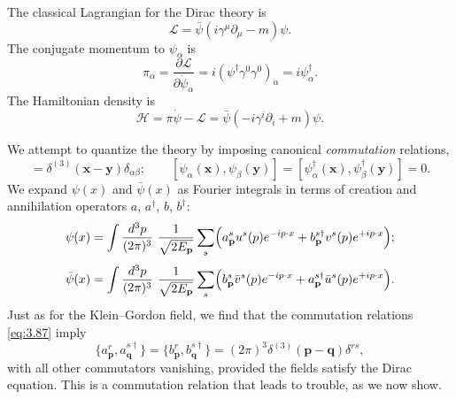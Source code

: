 The classical Lagrangian for the Dirac theory is
\begin{equation}
  \mathcal{L} = \bar{\psi}(i\gamma^\mu\partial_\mu - m)\psi .
  \label{eq:3.84}
\end{equation}
The conjugate momentum to $\psi_\alpha$ is
\begin{equation}
  \pi_\alpha = \frac{\partial\mathcal{L}}{\partial\dot{\psi}_\alpha}
    = i(\psi^\dagger\gamma^0\gamma^0)_\alpha = i\psi^\dagger_\alpha .
  \label{eq:3.85}
\end{equation}
The Hamiltonian density is
\begin{equation}
  \mathcal{H} = \pi\dot{\psi} - \mathcal{L}
    = \bar{\psi}(-i\gamma^i\partial_i + m)\psi .
  \label{eq:3.86}
\end{equation}

We attempt to quantize the theory by imposing canonical \emph{commutation}
relations,
\begin{equation}
  [\psi_\alpha(\mathbf{x}), \psi_\beta^\dagger(\mathbf{y})]
    = \delta^{(3)}(\mathbf{x}-\mathbf{y})\delta_{\alpha\beta};
  \qquad
  [\psi_\alpha(\mathbf{x}), \psi_\beta(\mathbf{y})]
  = [\psi_\alpha^\dagger(\mathbf{x}), \psi_\beta^\dagger(\mathbf{y})] = 0 .
  \label{eq:3.87}
\end{equation}
We expand $\psi(x)$ and $\bar{\psi}(x)$ as Fourier integrals in terms of
creation and annihilation operators $a$, $a^\dagger$, $b$, $b^\dagger$:
\begin{equation}
  \psi(x) = \int \frac{d^3p}{(2\pi)^3}\ \frac{1}{\sqrt{2E_{\mathbf{p}}}}
    \sum_s \Bigl( a_{\mathbf{p}}^s u^s(p)e^{-ip\cdot x}
      + b_{\mathbf{p}}^{s\dagger} v^s(p)e^{+ip\cdot x} \Bigr);
  \label{eq:3.88}
\end{equation}
\begin{equation}
  \bar{\psi}(x) = \int \frac{d^3p}{(2\pi)^3}\ \frac{1}{\sqrt{2E_{\mathbf{p}}}}
    \sum_s \Bigl( b_{\mathbf{p}}^s \bar{v}^s(p)e^{-ip\cdot x}
      + a_{\mathbf{p}}^{s\dagger} \bar{u}^s(p)e^{+ip\cdot x} \Bigr).
  \label{eq:3.89}
\end{equation}
Just as for the Klein--Gordon field, we find that the commutation relations
\eqref{eq:3.87} imply
\begin{equation}
  \{a_{\mathbf{p}}^r, a_{\mathbf{q}}^{s\dagger}\}
  = \{b_{\mathbf{p}}^r, b_{\mathbf{q}}^{s\dagger}\}
    = (2\pi)^3\delta^{(3)}(\mathbf{p}-\mathbf{q})\delta^{rs},
  \label{eq:3.90}
\end{equation}
with all other commutators vanishing, provided the fields satisfy the Dirac
equation.  This is a commutation relation that leads to trouble, as we now
show.

